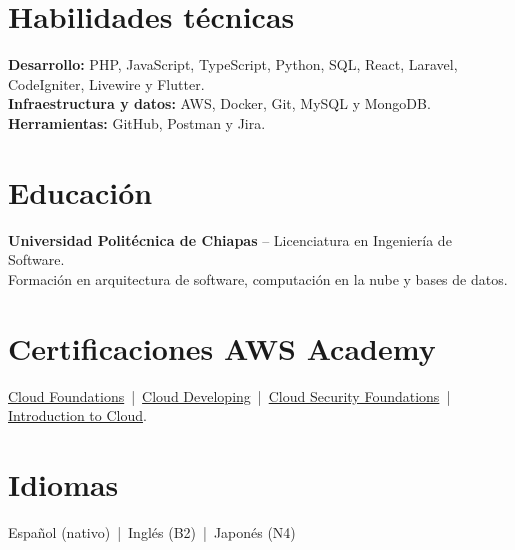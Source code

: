 \section{Habilidades t\'ecnicas}
\textbf{Desarrollo:} PHP, JavaScript, TypeScript, Python, SQL, React, Laravel, CodeIgniter, Livewire y Flutter.\\
\textbf{Infraestructura y datos:} AWS, Docker, Git, MySQL y MongoDB. \quad \textbf{Herramientas:} GitHub, Postman y Jira.

\section{Educaci\'on}
\textbf{Universidad Polit\'ecnica de Chiapas} -- Licenciatura en Ingenier\'ia de Software.\\
Formaci\'on en arquitectura de software, computaci\'on en la nube y bases de datos.

\section{Certificaciones AWS Academy}
\href{https://www.credly.com/badges/17c50411-0cbe-4586-bd34-00c130c92e22/public_url}{Cloud Foundations} \,|\,
\href{https://www.credly.com/badges/920866d4-e314-469b-87d3-b4da8c069864/public_url}{Cloud Developing} \,|\,
\href{https://www.credly.com/badges/dbcfcfd3-7d99-4877-b777-1489e1edf8d5/public_url}{Cloud Security Foundations} \,|\,
\href{https://www.credly.com/badges/657cf76c-0b10-40ba-a55d-62f35c764ac2/public_url}{Introduction to Cloud}.

\section{Idiomas}
Espa\~nol (nativo) \,|\, Ingl\'es (B2) \,|\, Japon\'es (N4)
